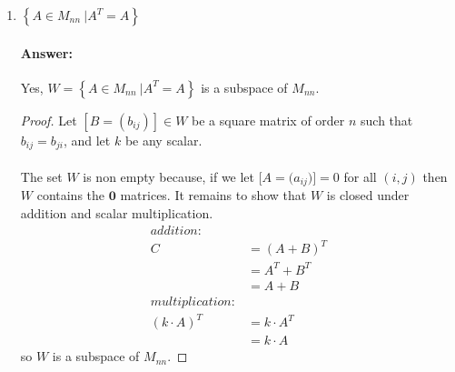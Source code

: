 \documentclass[12pt]{article}
\newcommand{\DS} [1] {${\displaystyle #1}$}
\begin{document}
\begin{enumerate}
\begin{enumerate}
\begin{proof}
\begin{align*}
                                                            & = 0
                                    \end{align*}
                                    To be clear, if we take some $C = A+B$ such that A and B are in $W$,
                                    then for all $C = (c_{ii})$, the sum will be $0$, so $C$ is also in $W$.
                                    Therefore $W$ is a subspace of $M_{nn}$.
                            \end{proof}
                            \pagebreak
                      \item \DS{ \left\{A \in{M_{nn}} \ | A^T = A \right\}}
                            \paragraph{Answer:} Yes, $W={ \left\{A \in{M_{nn}} \ |
                                    A^T = A \right\}}$ is a subspace of $M_{nn}$.
                            \begin{proof}
                                    Let $[B = (b_{ij})]\in W$ be a square matrix of order $n$
                                    such that $b_{ij} = b_{ji}$, and let ${k}$ be any scalar.\\\\
                                    The set $W$ is non empty because, if we let $[A=({a_{ij})]=0}$
                                    for all $(i,j)$ then $W$ contains the $\mathbf{0}$ matrices.
                                    It remains to show that $W$ is closed under addition and scalar multiplication.
                                    \begin{align*}
                                            addition:       &                \\
                                            C               & = (A+B)^T      \\
                                                            & = A^T+B^T      \\
                                                            & = A + B        \\
                                            multiplication: &                \\
                                            (k\cdot A)^{T}  & = k\cdot A^{T} \\
                                                            & = k\cdot A
                                    \end{align*}
                                    so $W$ is a subspace of $M_{nn}$.
                            \end{proof} \pagebreak
              \end{enumerate}


\end{enumerate}
\end{document}
